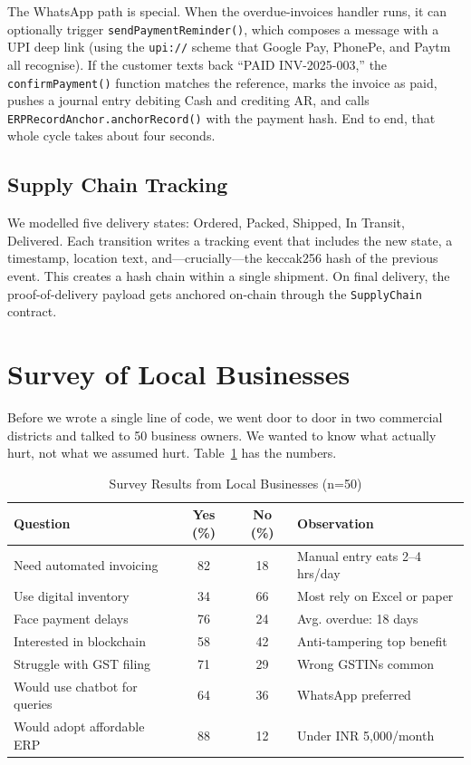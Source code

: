 \documentclass[conference]{IEEEtran}
\begin{document}
The WhatsApp path is special. When the overdue-invoices handler runs, it can optionally trigger \texttt{sendPaymentReminder()}, which composes a message with a UPI deep link (using the \texttt{upi://} scheme that Google Pay, PhonePe, and Paytm all recognise). If the customer texts back ``PAID INV-2025-003,'' the \texttt{confirmPayment()} function matches the reference, marks the invoice as paid, pushes a journal entry debiting Cash and crediting AR, and calls \texttt{ERPRecordAnchor.anchorRecord()} with the payment hash. End to end, that whole cycle takes about four seconds.

\subsection{Supply Chain Tracking}
We modelled five delivery states: Ordered, Packed, Shipped, In Transit, Delivered. Each transition writes a tracking event that includes the new state, a timestamp, location text, and---crucially---the keccak256 hash of the previous event. This creates a hash chain within a single shipment. On final delivery, the proof-of-delivery payload gets anchored on-chain through the \texttt{SupplyChain} contract.

\section{Survey of Local Businesses}

Before we wrote a single line of code, we went door to door in two commercial districts and talked to 50 business owners. We wanted to know what actually hurt, not what we assumed hurt. Table~\ref{tab_survey} has the numbers.

\begin{table}[htbp]
\caption{Survey Results from Local Businesses (n=50)}
\begin{center}
\renewcommand{\arraystretch}{1.3}
\begin{tabular}{|p{2.5cm}|c|c|p{2.5cm}|}
\hline
\textbf{Question} & \textbf{Yes (\%)} & \textbf{No (\%)} & \textbf{Observation} \\
\hline
Need automated invoicing & 82 & 18 & Manual entry eats 2--4 hrs/day \\
\hline
Use digital inventory & 34 & 66 & Most rely on Excel or paper \\
\hline
Face payment delays & 76 & 24 & Avg. overdue: 18 days \\
\hline
Interested in blockchain & 58 & 42 & Anti-tampering top benefit \\
\hline
Struggle with GST filing & 71 & 29 & Wrong GSTINs common \\
\hline
Would use chatbot for queries & 64 & 36 & WhatsApp preferred \\
\hline
Would adopt affordable ERP & 88 & 12 & Under INR 5{,}000/month \\
\hline
\end{tabular}
\label{tab_survey}
\end{center}
\end{table}
\end{document}
